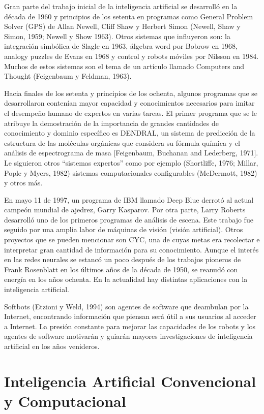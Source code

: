 Gran parte del trabajo inicial de la inteligencia artificial se desarrolló en la década de 1960 y principios de los setenta en programas como General Problem Solver (GPS) de Allan Newell, Cliff Shaw y Herbert Simon (Newell, Shaw y Simon, 1959; Newell y Show 1963). Otros sistemas que influyeron son: la integración simbólica de Slagle en 1963, álgebra word por Bobrow en 1968, analogy puzzles de Evans en 1968 y control y robots móviles por Nilsson en 1984. Muchos de estos sistemas son el tema de un artículo llamado Computers and Thought (Feigenbaum y Feldman, 1963).

Hacia finales de los setenta y principios de los ochenta, algunos programas que se desarrollaron contenían mayor capacidad y conocimientos necesarios para imitar el desempeño humano de expertos en varias tareas. El primer programa que se le atribuye la demostración de la importancia de grandes cantidades de conocimiento y dominio específico es DENDRAL, un sistema de predicción de la estructura de las moléculas orgánicas que considera su fórmula química y el análisis de espectrograma de masa [Feigenbaum, Buchanan and Lederberg, 1971]. Le siguieron otros “sistemas expertos” como por ejemplo (Shortliffe, 1976; Millar, Pople y Myers, 1982) sistemas computacionales configurables (McDermott, 1982) y otros más.

En mayo 11 de 1997, un programa de IBM llamado Deep Blue derrotó al actual campeón mundial de ajedrez, Garry Kasparov. Por otra parte, Larry Roberts desarrolló uno de los primeros programas de análisis de escena. Este trabajo fue seguido por una amplia labor de máquinas de visión (visión artificial). Otros proyectos que se pueden mencionar son CYC, una de cuyas metas era recolectar e interpretar gran cantidad de información para su conocimiento. Aunque el interés en las redes neurales se estancó un poco después de los trabajos pioneros de Frank Rosenblatt en los últimos años de la década de 1950, se reanudó con energía en los años ochenta. En la actualidad hay distintas aplicaciones con la inteligencia artificial.

Softbots (Etzioni y Weld, 1994) son agentes de software que deambulan por la Internet, encontrando información que piensan será útil a sus usuarios al acceder a Internet. La presión constante para mejorar las capacidades de los robots y los agentes de software motivarán y guiarán mayores investigaciones de inteligencia artificial en los años venideros.

\section{Inteligencia Artificial Convencional y Computacional}

